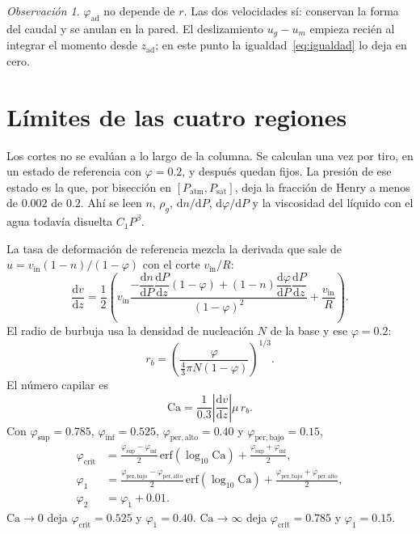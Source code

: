 \documentclass[11pt,a4paper]{article}
\newcommand{\sat}{\mathrm{sat}}
\newcommand{\ad}{\mathrm{ad}}
\theoremstyle{plain}
\theoremstyle{definition}
\theoremstyle{remark}
\newtheorem*{obs}{Observación}
\begin{document}
\begin{obs}
\(\varphi_{\ad}\) no depende de \(r\). Las dos velocidades sí: conservan la
forma del caudal y se anulan en la pared. El deslizamiento \(u_g-u_m\)
empieza recién al integrar el momento desde \(z_{\ad}\); en este punto la
igualdad~\eqref{eq:igualdad} lo deja en cero.
\end{obs}

\section{Límites de las cuatro regiones}

Los cortes no se evalúan a lo largo de la columna. Se calculan una vez por
tiro, en un estado de referencia con \(\varphi=0.2\), y después quedan fijos.
La presión de ese estado es la que, por bisección en
\([P_{\mathrm{atm}},P_{\sat}]\), deja la fracción de Henry a menos de
\(0.002\) de \(0.2\). Ahí se leen \(n\), \(\rho_g\), \(\mathrm{d}n/\mathrm{d}P\),
\(\mathrm{d}\varphi/\mathrm{d}P\) y la viscosidad del líquido con el agua
todavía disuelta \(C_1 P^{\beta}\).

La tasa de deformación de referencia mezcla la derivada que sale de
\(u=v_{\mathrm{in}}(1-n)/(1-\varphi)\) con el corte \(v_{\mathrm{in}}/R\):
\begin{equation}
\frac{\mathrm{d}v}{\mathrm{d}z}
=
\frac12
\left(
v_{\mathrm{in}}
\frac{-\dfrac{\mathrm{d}n}{\mathrm{d}P}\dfrac{\mathrm{d}P}{\mathrm{d}z}(1-\varphi)
+(1-n)\dfrac{\mathrm{d}\varphi}{\mathrm{d}P}\dfrac{\mathrm{d}P}{\mathrm{d}z}}
{(1-\varphi)^2}
+
\frac{v_{\mathrm{in}}}{R}
\right).
\label{eq:dvdz}
\end{equation}
El radio de burbuja usa la densidad de nucleación \(N\) de la base y ese
\(\varphi=0.2\):
\begin{equation}
r_b
=
\left(
\frac{\varphi}{\tfrac43\pi N(1-\varphi)}
\right)^{1/3}.
\label{eq:rbref}
\end{equation}
El número capilar es
\begin{equation}
\mathrm{Ca}
=
\frac{1}{0.3}
\left|\frac{\mathrm{d}v}{\mathrm{d}z}\right|
\mu\, r_b.
\label{eq:Ca}
\end{equation}
Con \(\varphi_{\sup}=0.785\), \(\varphi_{\inf}=0.525\),
\(\varphi_{\mathrm{per,alto}}=0.40\) y \(\varphi_{\mathrm{per,bajo}}=0.15\),
\begin{align}
\varphi_{\mathrm{crit}}
&=
\frac{\varphi_{\sup}-\varphi_{\inf}}{2}\,\mathrm{erf}(\log_{10}\mathrm{Ca})
+
\frac{\varphi_{\sup}+\varphi_{\inf}}{2},
\label{eq:phicrit}\\
\varphi_1
&=
\frac{\varphi_{\mathrm{per,bajo}}-\varphi_{\mathrm{per,alto}}}{2}
\,\mathrm{erf}(\log_{10}\mathrm{Ca})
+
\frac{\varphi_{\mathrm{per,bajo}}+\varphi_{\mathrm{per,alto}}}{2},
\label{eq:lim1}\\
\varphi_2
&=
\varphi_1+0.01.
\label{eq:lim2}
\end{align}
\(\mathrm{Ca}\to 0\) deja \(\varphi_{\mathrm{crit}}=0.525\) y \(\varphi_1=0.40\).
\(\mathrm{Ca}\to\infty\) deja \(\varphi_{\mathrm{crit}}=0.785\) y
\(\varphi_1=0.15\).
\end{document}
